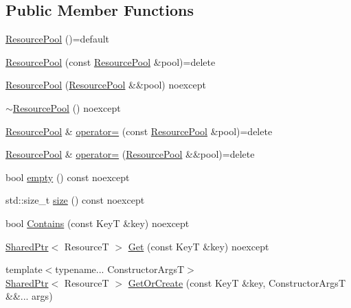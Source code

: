 \subsection*{Public Member Functions}
\begin{DoxyCompactItemize}
\item 
\mbox{\hyperlink{classmage_1_1_resource_pool_a94aff142869744ed48fb1b426face48b}{Resource\+Pool}} ()=default
\item 
\mbox{\hyperlink{classmage_1_1_resource_pool_ad1cc0cf98317e65900879b85625f10ac}{Resource\+Pool}} (const \mbox{\hyperlink{classmage_1_1_resource_pool}{Resource\+Pool}} \&pool)=delete
\item 
\mbox{\hyperlink{classmage_1_1_resource_pool_add752b5c5f2244cbc8f24ee0755dafcb}{Resource\+Pool}} (\mbox{\hyperlink{classmage_1_1_resource_pool}{Resource\+Pool}} \&\&pool) noexcept
\item 
\mbox{\hyperlink{classmage_1_1_resource_pool_ad5dceb2a1cbd47ced5cb6ad269f4510e}{$\sim$\+Resource\+Pool}} () noexcept
\item 
\mbox{\hyperlink{classmage_1_1_resource_pool}{Resource\+Pool}} \& \mbox{\hyperlink{classmage_1_1_resource_pool_accb458f018c38fc154fd3931e0129ad6}{operator=}} (const \mbox{\hyperlink{classmage_1_1_resource_pool}{Resource\+Pool}} \&pool)=delete
\item 
\mbox{\hyperlink{classmage_1_1_resource_pool}{Resource\+Pool}} \& \mbox{\hyperlink{classmage_1_1_resource_pool_a75dbf08b971929eb90d32b38faa3cfb1}{operator=}} (\mbox{\hyperlink{classmage_1_1_resource_pool}{Resource\+Pool}} \&\&pool)=delete
\item 
bool \mbox{\hyperlink{classmage_1_1_resource_pool_aa406e4382ec7047c5576d039d7adc424}{empty}} () const noexcept
\item 
std\+::size\+\_\+t \mbox{\hyperlink{classmage_1_1_resource_pool_ab9b3c0f117ed1118e93d4b677d535f92}{size}} () const noexcept
\item 
bool \mbox{\hyperlink{classmage_1_1_resource_pool_a36665c107134816d3e72322e9c80bebd}{Contains}} (const KeyT \&key) noexcept
\item 
\mbox{\hyperlink{namespacemage_a1e01ae66713838a7a67d30e44c67703e}{Shared\+Ptr}}$<$ ResourceT $>$ \mbox{\hyperlink{classmage_1_1_resource_pool_abdd0bc69948404b0185ef7c417e95ff9}{Get}} (const KeyT \&key) noexcept
\item 
{\footnotesize template$<$typename... Constructor\+ArgsT$>$ }\\\mbox{\hyperlink{namespacemage_a1e01ae66713838a7a67d30e44c67703e}{Shared\+Ptr}}$<$ ResourceT $>$ \mbox{\hyperlink{classmage_1_1_resource_pool_ab66c25c99198874eeae3ea54a5942c75}{Get\+Or\+Create}} (const KeyT \&key, Constructor\+ArgsT \&\&... args)

\end{DoxyCompactItemize}
